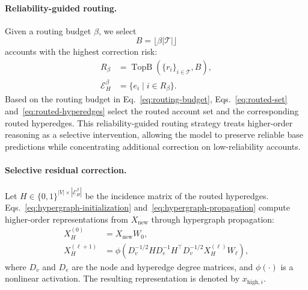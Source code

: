 \paragraph{Reliability-guided routing.}
Given a routing budget $\beta$, we select
\begin{equation}
B=\lfloor \beta |\mathcal{T}| \rfloor
\label{eq:routing-budget}
\end{equation}
accounts with the highest correction risk:
\begin{align}
R_{\beta} &= \operatorname{TopB}(\{r_i\}_{i\in \mathcal{T}}, B),
\label{eq:routed-set}\\
\mathcal{E}_H^{\beta} &= \{e_i\mid i\in R_{\beta}\}.
\label{eq:routed-hyperedges}
\end{align}
Based on the routing budget in Eq.~\eqref{eq:routing-budget}, Eqs.~\eqref{eq:routed-set} and~\eqref{eq:routed-hyperedges} select the routed account set and the corresponding routed hyperedges. This reliability-guided routing strategy treats higher-order reasoning as a selective intervention, allowing the model to preserve reliable base predictions while concentrating additional correction on low-reliability accounts.

\paragraph{Selective residual correction.}
Let $H\in\{0,1\}^{|V|\times |\mathcal{E}_H^{\beta}|}$ be the incidence matrix of the routed hyperedges. Eqs.~\eqref{eq:hypergraph-initialization} and~\eqref{eq:hypergraph-propagation} compute higher-order representations from $X_{\mathrm{new}}$ through hypergraph propagation:
\begin{align}
X_H^{(0)} &= X_{\mathrm{new}} W_0,
\label{eq:hypergraph-initialization}\\
X_H^{(\ell+1)} &=
\phi\!\left(D_v^{-1/2} H D_e^{-1} H^\top D_v^{-1/2} X_H^{(\ell)} W_{\ell}\right),
\label{eq:hypergraph-propagation}
\end{align}
where $D_v$ and $D_e$ are the node and hyperedge degree matrices, and $\phi(\cdot)$ is a nonlinear activation. The resulting representation is denoted by $x_{\mathrm{high},i}$.

